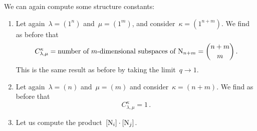 \documentclass[a4paper,11pt]{scrartcl}
\begin{document}
\begin{example}
  \label{computing multiplication over F1}
  We can again compute some structure constants:
  \begin{enumerate}
    \item
      Let again~$\lambda = (1^n)$ and~$\mu = (1^m)$, and consider~$\kappa = (1^{n+m})$.
      We find as before that
      \[
        C^{\kappa}_{\lambda, \mu}
        =
        \text{number of~\dimensional{$m$} subspaces of~$\Nil_{n+m}$}
        =
        \binom{n+m}{m} \,.
      \]
      This is the same result as before by taking the limit~$q \to 1$.
    \item
      Let again~$\lambda = (n)$ and~$\mu = (m)$ and consider~$\kappa = (n+m)$.
      We find as before that
      \[
        C^{\kappa}_{\lambda, \mu} = 1 \,.
      \]
    \item
      Let us compute the product~$[\mathrm{N}_i] \cdot [\mathrm{N}_j]$.


\end{enumerate}
\end{example}
\end{document}
